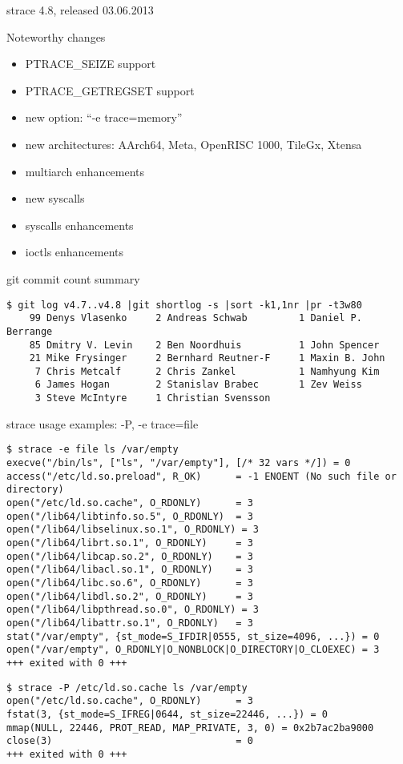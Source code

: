 \documentclass[unicode]{beamer}
\begin{document}
\begin{frame}[fragile]{strace 4.8, released 03.06.2013}
	\begin{block}{Noteworthy changes}
	\scriptsize
	\begin{itemize}
		\item PTRACE\_SEIZE support
		\item PTRACE\_GETREGSET support
		\item new option: ``-e trace=memory''
		\item new architectures: AArch64, Meta, OpenRISC 1000, TileGx, Xtensa
		\item multiarch enhancements
		\item new syscalls
		\item syscalls enhancements
		\item ioctls enhancements
	\end{itemize}
	\end{block}
	\begin{block}{git commit count summary}
	\scriptsize
\begin{verbatim}
$ git log v4.7..v4.8 |git shortlog -s |sort -k1,1nr |pr -t3w80
    99 Denys Vlasenko     2 Andreas Schwab         1 Daniel P. Berrange
    85 Dmitry V. Levin    2 Ben Noordhuis          1 John Spencer
    21 Mike Frysinger     2 Bernhard Reutner-F     1 Maxin B. John
     7 Chris Metcalf      2 Chris Zankel           1 Namhyung Kim
     6 James Hogan        2 Stanislav Brabec       1 Zev Weiss
     3 Steve McIntyre     1 Christian Svensson
\end{verbatim}
	\end{block}
\end{frame}

\begin{frame}[fragile]{strace usage examples: -P, -e trace=file}
\scriptsize
\begin{verbatim}
$ strace -e file ls /var/empty
execve("/bin/ls", ["ls", "/var/empty"], [/* 32 vars */]) = 0
access("/etc/ld.so.preload", R_OK)      = -1 ENOENT (No such file or directory)
open("/etc/ld.so.cache", O_RDONLY)      = 3
open("/lib64/libtinfo.so.5", O_RDONLY)  = 3
open("/lib64/libselinux.so.1", O_RDONLY) = 3
open("/lib64/librt.so.1", O_RDONLY)     = 3
open("/lib64/libcap.so.2", O_RDONLY)    = 3
open("/lib64/libacl.so.1", O_RDONLY)    = 3
open("/lib64/libc.so.6", O_RDONLY)      = 3
open("/lib64/libdl.so.2", O_RDONLY)     = 3
open("/lib64/libpthread.so.0", O_RDONLY) = 3
open("/lib64/libattr.so.1", O_RDONLY)   = 3
stat("/var/empty", {st_mode=S_IFDIR|0555, st_size=4096, ...}) = 0
open("/var/empty", O_RDONLY|O_NONBLOCK|O_DIRECTORY|O_CLOEXEC) = 3
+++ exited with 0 +++
\end{verbatim}

\begin{verbatim}
$ strace -P /etc/ld.so.cache ls /var/empty
open("/etc/ld.so.cache", O_RDONLY)      = 3
fstat(3, {st_mode=S_IFREG|0644, st_size=22446, ...}) = 0
mmap(NULL, 22446, PROT_READ, MAP_PRIVATE, 3, 0) = 0x2b7ac2ba9000
close(3)                                = 0
+++ exited with 0 +++
\end{verbatim}
\end{frame}
\end{document}
